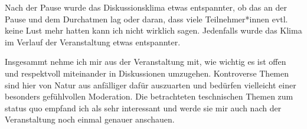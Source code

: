 \documentclass[12pt]{article}
\begin{document}
\vspace{1em}

Nach der Pause wurde das Diskussionsklima etwas entspannter, ob das an der Pause und dem Durchatmen lag oder daran, dass viele Teilnehmer*innen evtl. keine Lust mehr hatten kann ich nicht wirklich sagen.
Jedenfalls wurde das Klima im Verlauf der Veranstaltung etwas entspannter.

Insgesammt nehme ich mir aus der Veranstaltung mit, wie wichtig es ist offen und respektvoll miteinander in Diskussionen umzugehen. Kontroverse Themen sind hier von Natur aus anfälliger dafür auszuarten und bedürfen vielleicht einer besonders gefühlvollen Moderation.
Die betrachteten teschnischen Themen zum status quo empfand ich als sehr interessant und werde sie mir auch nach der Veranstaltung noch einmal genauer anschauen.
\end{document}

